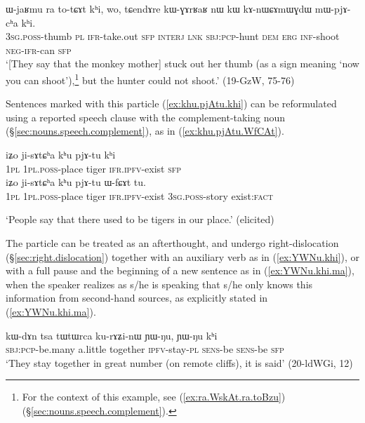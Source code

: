 \begin{exe}
\ex \label{ex:mWpjAcha.khi}
\gll ɯ-jaʁmu ra to-tɕɤt kʰi, wo, tɕendɤre kɯ-ɣɤrʁaʁ nɯ kɯ kɤ-nɯɕɤmɯɣdɯ mɯ-pjɤ-cʰa kʰi. \\
\textsc{3sg}.\textsc{poss}-thumb \textsc{pl} \textsc{ifr}-take.out \textsc{sfp} \textsc{interj} \textsc{lnk} \textsc{sbj}:\textsc{pcp}-hunt \textsc{dem} \textsc{erg} \textsc{inf}-shoot \textsc{neg}-\textsc{ifr}-can \textsc{sfp} \\
\glt `[They say that the monkey mother] stuck out her thumb (as a sign meaning `now you can shoot'),\footnote{For the context of this example, see (\ref{ex:ra.WskAt.ra.toBzu}) (§\ref{sec:nouns.speech.complement}).} but the hunter could not shoot.' (19-GzW, 75-76)
\end{exe}

Sentences marked with this particle (\ref{ex:khu.pjAtu.khi}) can be reformulated using a reported speech clause with the complement-taking noun   (§\ref{sec:nouns.speech.complement}), as in (\ref{ex:khu.pjAtu.WfCAt}).

\begin{exe}
\ex 
\begin{xlist}
\ex \label{ex:khu.pjAtu.khi}
\gll iʑo ji-sɤtɕʰa kʰu pjɤ-tu kʰi \\
\textsc{1pl} \textsc{1pl}.\textsc{poss}-place tiger \textsc{ifr}.\textsc{ipfv}-exist \textsc{sfp} \\ 
\ex \label{ex:khu.pjAtu.WfCAt}
\gll iʑo ji-sɤtɕʰa kʰu pjɤ-tu ɯ-fɕɤt tu.\\
\textsc{1pl} \textsc{1pl}.\textsc{poss}-place tiger \textsc{ifr}.\textsc{ipfv}-exist \textsc{3sg}.\textsc{poss}-story exist:\textsc{fact} \\
\end{xlist}
\glt `People say that there used to be tigers in our place.' (elicited)
\end{exe}

The particle  can be treated as an afterthought, and undergo right-dislocation (§\ref{sec:right.dislocation}) together with an auxiliary verb as in (\ref{ex:YWNu.khi}), or with a full pause and the beginning of a new sentence as in (\ref{ex:YWNu.khi.ma}), when the speaker realizes as s/he is speaking that s/he only knows this information from second-hand sources, as explicitly stated in (\ref{ex:YWNu.khi.ma}).

\begin{exe}
\ex \label{ex:YWNu.khi}
\gll kɯ-dɤn tsa tɯtɯrca ku-rɤʑi-nɯ ɲɯ-ŋu, ɲɯ-ŋu kʰi  \\
\textsc{sbj}:\textsc{pcp}-be.many a.little together \textsc{ipfv}-stay-\textsc{pl} \textsc{sens}-be \textsc{sens}-be \textsc{sfp} \\
\glt `They stay together in great number (on remote cliffs), it is said' (20-ldWGi, 12)
\end{exe}


